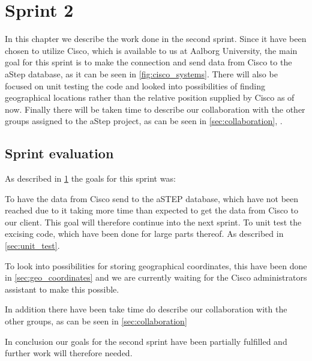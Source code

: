 \chapter{Sprint 2} \label{cha:sprint2}
In this chapter we describe the work done in the second sprint. Since it have been chosen to utilize Cisco, which is available to us at Aalborg University, the main goal for this sprint is to make the connection and send data from Cisco to the aStep database, as it can be seen in \cref{fig:cisco_systems}. There will also be focused on unit testing the code and looked into possibilities of finding geographical locations rather than the relative position supplied by Cisco as of now. Finally there will be taken time to describe our collaboration with the other groups assigned to the aStep project, as can be seen in \cref{sec:collaboration}, .







\section{Sprint evaluation}
As described in \cref{cha:sprint2} the goals for this sprint was: 

To have the data from Cisco send to the aSTEP database, which have not been reached due to it taking more time than expected to get the data from Cisco to our client. This goal will therefore continue into the next sprint.
To unit test the excising code, which have been done for large parts thereof. As described in \cref{sec:unit_test}.

To look into possibilities for storing geographical coordinates, this have been done in \cref{sec:geo_coordinates} and we are currently waiting for the Cisco administrators assistant to make this possible.

In addition there have been take time do describe our collaboration with the other groups, as can be seen in \cref{sec:collaboration} 

In conclusion our goals for the second sprint have been partially fulfilled and further work will therefore needed.

